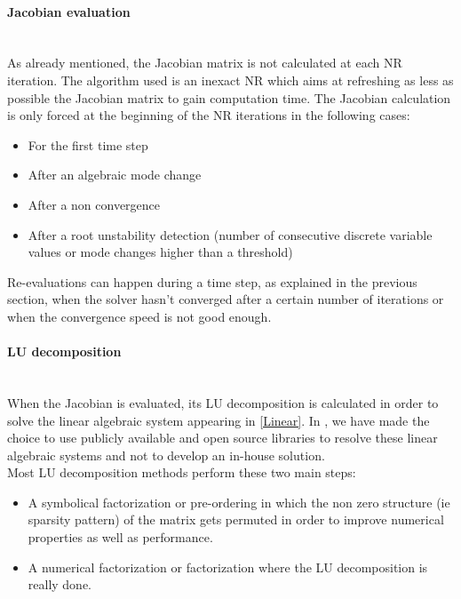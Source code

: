 \documentclass[a4paper, 12pt]{report}
\begin{document}
\paragraph{Jacobian evaluation}
~~\\

As already mentioned, the Jacobian matrix is not calculated at each \ac{NR} iteration. The algorithm used is an inexact \ac{NR} which aims at refreshing as less as possible the Jacobian matrix to gain computation time. The Jacobian calculation is only forced at the beginning of the \ac{NR} iterations in the following cases:
\begin{itemize}
\item For the first time step
\item After an algebraic mode change
\item After a non convergence
\item After a root unstability detection (number of consecutive discrete variable values or mode changes higher than a threshold)
\end{itemize}

Re-evaluations can happen during a time step, as explained in the previous section, when the solver hasn't converged after a certain number of iterations or when the convergence speed is not good enough.

\paragraph{LU decomposition}
~~\\

When the Jacobian is evaluated, its LU decomposition is calculated in order to solve the linear algebraic system appearing in \eqref{Linear}. In \Dynawo , we have made the choice to use publicly available and open source libraries to resolve these linear algebraic systems and not to develop an in-house solution. \\

Most LU decomposition methods perform these two main steps:
\begin{itemize}
\item A symbolical factorization or pre-ordering in which the non zero structure (ie sparsity pattern) of the matrix gets permuted in order to improve numerical properties as well as performance.
\item A numerical factorization or factorization where the LU decomposition is really done.
\end{itemize}
\end{document}
